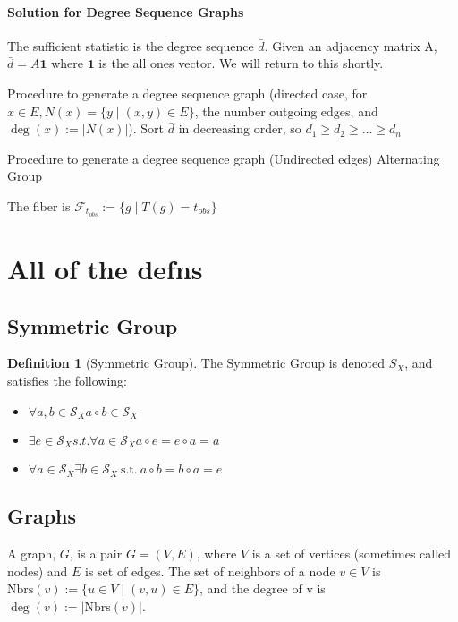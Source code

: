 \documentclass{article}
\theoremstyle{definition}
\newtheorem{definition}{Definition}
\begin{document}
\paragraph{Solution for Degree Sequence Graphs}
The sufficient statistic is the degree sequence $\bar{d}$. Given an adjacency matrix A, $\bar{d} = A \mathbf{1}$ where $\mathbf{1}$ is the all ones vector. We will return to this shortly.

Procedure to generate a degree sequence graph (directed case, for $x \in E, N(x) = \{y \mid (x,y) \in E\}$, the number outgoing edges, and $\deg(x) := |N(x)|$).
Sort $\bar{d}$ in decreasing order, so \( d_1 \geq d_2 \geq \dots \geq d_n \)

Procedure to generate a degree sequence graph (Undirected edges)
Alternating Group

The fiber is
\( \mathcal{F}_{t_{obs}} := \{ g \mid T(g) = t_{obs} \} \)


\section{All of the defns}

\subsection{Symmetric Group}
\begin{definition}[Symmetric Group] The Symmetric Group is denoted $S_X$, and satisfies the following:
\begin{itemize}
\item \( \forall a,b \in \mathcal{S}_X  a \circ b \in \mathcal{S}_X \)
\item \( \exists e \in \mathcal{S}_X s.t. \forall a \in \mathcal{S}_X a \circ e = e \circ a = a\)
\item \( \forall a \in \mathcal{S}_X \exists b \in \mathcal{S}_X \: \text{s.t.} \: a \circ b = b \circ a = e\)
\end{itemize}
\end{definition}

\subsection{Graphs}
A graph, $G$, is a pair $G=(V,E)$, where $V$ is a set of vertices (sometimes called nodes) and $E$ is set of edges. The set of neighbors of a node $v \in V$ is $ \text{Nbrs}(v) := \{u \in V \mid (v,u) \in E\}$, and the degree of v is $\deg(v) := |\text{Nbrs}(v) |$. 
\end{document}
